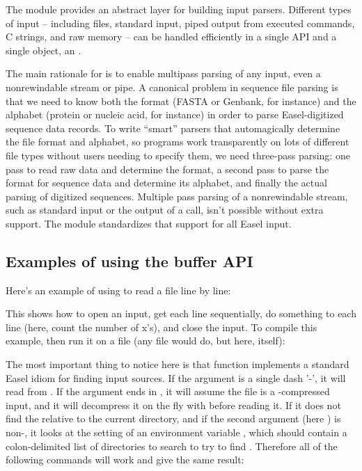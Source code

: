 The  module provides an abstract layer for building
input parsers. Different types of input -- including files, standard
input, piped output from executed commands, C strings, and raw memory
-- can be handled efficiently in a single API and a single object, an
. 

The main rationale for  is to enable multipass parsing
of any input, even a nonrewindable stream or pipe. A canonical problem
in sequence file parsing is that we need to know both the format
(FASTA or Genbank, for instance) and the alphabet (protein or nucleic
acid, for instance) in order to parse Easel-digitized sequence data
records. To write ``smart'' parsers that automagically determine the
file format and alphabet, so programs work transparently on lots of
different file types without users needing to specify them, we need
three-pass parsing: one pass to read raw data and determine the
format, a second pass to parse the format for sequence data and
determine its alphabet, and finally the actual parsing of digitized
sequences. Multiple pass parsing of a nonrewindable stream, such as
standard input or the output of a  call, isn't possible
without extra support. The  module standardizes that
support for all Easel input.

\subsection{Examples of using the buffer API}

Here's an example of using  to read a file line by
line:



This shows how to open an input, get each line sequentially, do
something to each line (here, count the number of x's), and close the
input.  To compile this example, then run it on a file (any file would
do, but here,  itself):


The most important thing to notice here is that
 function implements a standard Easel idiom
for finding input sources. If the  argument is a
single dash '-', it will read from . If the
 argument ends in , it will assume the file
is a -compressed input, and it will decompress it on the
fly with  before reading it. If it does not find the
 relative to the current directory, and if the second
argument (here ) is non-, it looks at the
setting of an environment variable , which should
contain a colon-delimited list of directories to search to try to find
. Therefore all of the following commands will work
and give the same result:

